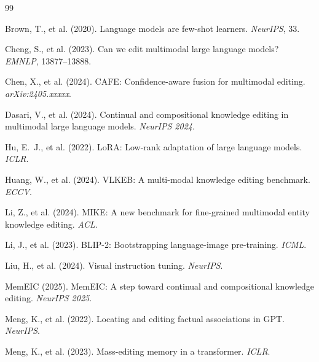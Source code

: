 \documentclass[11pt]{article}
\begin{document}

\begin{thebibliography}{99}

Brown, T., et al. (2020).
\newblock Language models are few-shot learners.
\newblock \textit{NeurIPS}, 33.

Cheng, S., et al. (2023).
\newblock Can we edit multimodal large language models?
\newblock \textit{EMNLP}, 13877--13888.

Chen, X., et al. (2024).
\newblock CAFE: Confidence-aware fusion for multimodal editing.
\newblock \textit{arXiv:2405.xxxxx}.

Dasari, V., et al. (2024).
\newblock Continual and compositional knowledge editing in multimodal large
  language models.
\newblock \textit{NeurIPS 2024}.

Hu, E.~J., et al. (2022).
\newblock LoRA: Low-rank adaptation of large language models.
\newblock \textit{ICLR}.

Huang, W., et al. (2024).
\newblock VLKEB: A multi-modal knowledge editing benchmark.
\newblock \textit{ECCV}.

Li, Z., et al. (2024).
\newblock MIKE: A new benchmark for fine-grained multimodal entity knowledge
  editing.
\newblock \textit{ACL}.

Li, J., et al. (2023).
\newblock BLIP-2: Bootstrapping language-image pre-training.
\newblock \textit{ICML}.

Liu, H., et al. (2024).
\newblock Visual instruction tuning.
\newblock \textit{NeurIPS}.

MemEIC (2025).
\newblock MemEIC: A step toward continual and compositional knowledge editing.
\newblock \textit{NeurIPS 2025}.

Meng, K., et al. (2022).
\newblock Locating and editing factual associations in GPT.
\newblock \textit{NeurIPS}.

Meng, K., et al. (2023).
\newblock Mass-editing memory in a transformer.
\newblock \textit{ICLR}.


\end{thebibliography}
\end{document}
